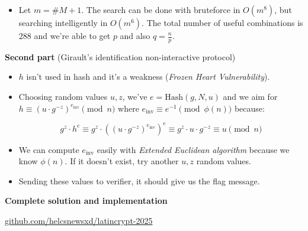 \documentclass[a0paper,portrait]{baposter}
\begin{document}
\begin{poster}
{\begin{itemize}
      \vspace{-0.8em}
    \item Let $m = \#M + 1$. The search can be done with bruteforce in $O(m^8)$,
      but searching intelligently in $O(m^6)$.
      The total number of useful combinations is $288$ and we're able 
      to get $p$ and also $q = \frac{n}{p}$.
  \end{itemize}

  \textbf{Second part} (Girault's identification non-interactive protocol)
  
  \begin{itemize}
    \item $h$ isn't used in hash and it's a weakness (\textit{Frozen Heart Vulnerability}).
    \item Choosing random values $u,z$, we've $e = \text{Hash}(g,N,u)$ and we aim for
      $h \equiv (u \cdot g^{-z})^{e_\text{inv}} \pmod{n}$ where $e_\text{inv} \equiv e^{-1} \pmod{\phi(n)}$
      because:

      \vspace{-1em}
      \begin{equation*}
        g^z \cdot h^e \equiv g^z \cdot \left((u \cdot g^{-z})^{e_\text{inv}}\right)^e \equiv g^z \cdot u \cdot g^{-z} \equiv u \pmod{n}
      \end{equation*}


      \vspace{-0.6em}
    \item We can compute $e_\text{inv}$ easily with \textit{Extended Euclidean algorithm} because we know
      $\phi(n)$.
      If it doesn't exist, try another $u,z$ random values.
    \item Sending these values to verifier, it should give us the flag message.
  \end{itemize}

  \textbf{Complete solution and implementation}

  \begin{center}
    \raisebox{-0.3em}{\Large\faGithub}\quad \url{github.com/helcsnewsxd/latincrypt-2025}
  \end{center}
}

\end{poster}
\end{document}

